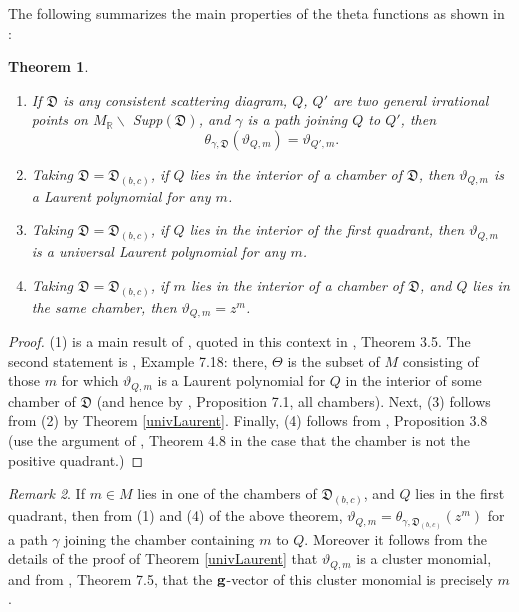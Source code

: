 \documentclass[11pt]{amsart}
\newtheorem{theorem}{Theorem}[section]
\theoremstyle{remark}
\newtheorem{remark}[theorem]{Remark}
\numberwithin{equation}{section}
\newcommand{\RR}{\mathbb{R}}
\newcommand{\DD}{\mathfrak{D}}
\begin{document}
The following summarizes the main properties of the theta functions as shown in
\cite{GHKK}:
\begin{theorem} $ $
  \begin{enumerate}
    \item
      If $\DD$ is any consistent scattering diagram, $Q$, $Q'$ are two general
      irrational points on $M_{\RR} \backslash$ Supp$(\DD)$, and $\gamma$ is a
      path joining $Q$ to $Q'$, then 
      \[
        \theta_{\gamma, \DD }(\vartheta_{Q,m}) = \vartheta_{Q', m}. 
      \]
    
    \item 
      Taking $\DD=\DD_{(b,c)}$, if $Q$ lies in the interior of a chamber of
      $\DD$, then $\vartheta_{Q,m}$ is a Laurent polynomial for any $m$.
    
    \item 
      Taking $\DD=\DD_{(b,c)}$, if $Q$ lies in the interior of the first
      quadrant, then $\vartheta_{Q,m}$ is a universal Laurent polynomial for
      any $m$.

    \item 
      Taking $\DD=\DD_{(b,c)}$, if $m$ lies in the interior of a chamber of
      $\DD$, and $Q$ lies in the same chamber, then $\vartheta_{Q,m}=z^{m}$.
   
  \end{enumerate}
\end{theorem}

\begin{proof}
  (1) is a main result of \cite{CPS}, quoted in this context in \cite{GHKK},
  Theorem 3.5.  The second statement is \cite{GHKK}, Example 7.18: there,
  $\Theta$ is the subset of $M$ consisting of those $m$ for which
  $\vartheta_{Q,m}$ is a Laurent polynomial for $Q$ in the interior of 
  some chamber of $\DD$ (and hence by \cite{GHKK}, Proposition 7.1, all 
  chambers).
  Next, (3) follows from (2) by Theorem \ref{univLaurent}. 
  Finally, (4) follows from \cite{GHKK}, Proposition 3.8 (use the argument of
  \cite{GHKK}, Theorem 4.8 in the case that the chamber is not the positive
  quadrant.)
\end{proof}

\begin{remark} 
  \label{rk:theta functions g-vector}
  If $m\in M$ lies in one of the chambers of $\DD_{(b,c)}$, and $Q$ lies in
  the first quadrant, then from (1) and (4) of the above theorem,
  $\vartheta_{Q,m}=\theta_{\gamma,\DD_{(b,c)}}(z^{m})$ for a path $\gamma$
  joining the chamber containing $m$ to $Q$. Moreover it follows from the
  details of the proof of Theorem \ref{univLaurent} that $\vartheta_{Q,m}$ is
  a cluster monomial, and from \cite{GHKK}, Theorem 7.5, that the 
  ${\bf g}$-vector of this cluster monomial is precisely $m$. 
\end{remark}
\end{document}
